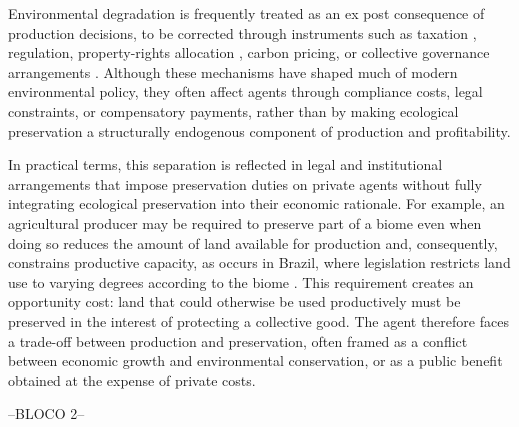 Environmental degradation is frequently treated as an ex post consequence of production decisions, to be corrected through instruments such as taxation \cite{pigou2010liberty}, regulation, property-rights allocation \cite{hardin1968tragedy}, carbon pricing, or collective governance arrangements \cite{ostrom2002commonpool}. Although these mechanisms have shaped much of modern environmental policy, they often affect agents through compliance costs, legal constraints, or compensatory payments, rather than by making ecological preservation a structurally endogenous component of production and profitability. 

In practical terms, this separation is reflected in legal and institutional arrangements that impose preservation duties on private agents without fully integrating ecological preservation into their economic rationale. For example, an agricultural producer may be required to preserve part of a biome even when doing so reduces the amount of land available for production and, consequently, constrains productive capacity, as occurs in Brazil, where legislation restricts land use to varying degrees according to the biome \cite{brasil2012florestal}. This requirement creates an opportunity cost: land that could otherwise be used productively must be preserved in the interest of protecting a collective good. The agent therefore faces a trade-off between production and preservation, often framed as a conflict between economic growth and environmental conservation, or as a public benefit obtained at the expense of private costs.



--BLOCO 2--



